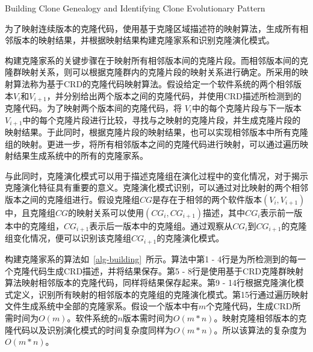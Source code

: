 {Building Clone Genealogy and Identifying Clone Evolutionary Pattern}

为了映射连续版本的克隆代码，使用基于克隆区域描述符的映射算法，生成所有相邻版本的映射结果，并根据映射结果构建克隆家系和识别克隆演化模式。

构建克隆家系的关键步骤在于映射所有相邻版本间的克隆片段。而相邻版本间的克隆群映射关系，则可以根据克隆群内的克隆片段的映射关系进行确定。所采用的映射算法称为基于CRD的克隆代码映射算法\cite{ci2013new,ci2013newD}。假设给定一个软件系统的两个相邻版本{$V_i$}和{$V_ {i + 1}$}，并分别给出两个版本之间的克隆代码，并使用CRD描述所检测到的克隆代码。为了映射两个版本间的克隆代码，将{ $V_i$}中的每个克隆片段与下一版本{$ V_{i+1}$}中的每个克隆片段进行比较，寻找与之映射的克隆片段，并生成克隆片段的映射结果。于此同时，根据克隆片段的映射结果，也可以实现相邻版本中所有克隆组的映射。更进一步，将所有相邻版本之间的克隆代码进行映射，可以通过遍历映射结果生成系统中的所有的克隆家系。

与此同时，克隆演化模式可以用于描述克隆组在演化过程中的变化情况，对于揭示克隆演化特征具有重要的意义。克隆演化模式识别，可以通过对比映射的两个相邻版本之间的克隆组进行。假设克隆组$CG$是存在于相邻的两个软件版本{$(V_i,V_{i+1})$}中，且克隆组$CG$的映射关系可以使用{$(CG_i, CG_{i+1})$}描述，其中{$CG_i$}表示前一版本中的克隆组，{$CG_{i+1}$}表示后一版本中的克隆组。通过观察从{$CG_i$}到{$CG_{i+1}$}的克隆组变化情况，便可以识别该克隆组{$CG_{i+1}$}的克隆演化模式。

构建克隆家系的算法如~\ref{alg-building}~所示。算法中第1 - 4行是为所检测到的每一个克隆代码生成CRD描述，并将结果保存。第5 - 8行是使用基于CRD克隆群映射算法映射相邻版本的克隆代码，同样将结果保存起来。第9 - 14行根据克隆演化模式定义，识别所有映射的相邻版本的克隆组的克隆演化模式。第15行通过遍历映射文件生成系统中全部的克隆家系。假设一个版本中有$m$个克隆代码，生成CRD所需时间为$O(m)$。软件系统的$n$版本需时间为$O(m*n)$。映射克隆相邻版本的克隆代码以及识别演化模式的时间复杂度同样为$O(m*n)$。所以该算法的复杂度为$O(m*n)$。

